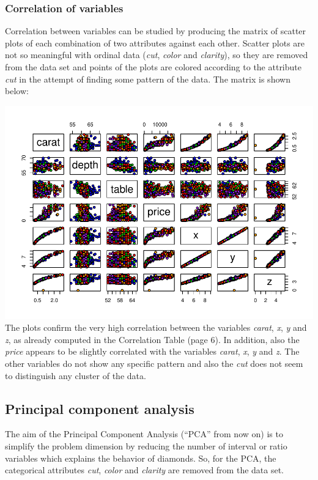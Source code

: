 \documentclass[
]{article}
\begin{document}
\newpage

\subsubsection{Correlation of variables}\label{correlation-of-variables}

Correlation between variables can be studied by producing the matrix of
scatter plots of each combination of two attributes against each other.
Scatter plots are not so meaningful with ordinal data (\emph{cut},
\emph{color} and \emph{clarity}), so they are removed from the data set
and points of the plots are colored according to the attribute
\emph{cut} in the attempt of finding some pattern of the data. The
matrix is shown below:

\includegraphics{Report_files/figure-latex/unnamed-chunk-9-1.pdf} The
plots confirm the very high correlation between the variables
\emph{carat}, \emph{x}, \emph{y} and \emph{z}, as already computed in
the Correlation Table (page 6). In addition, also the \emph{price}
appears to be slightly correlated with the variables \emph{carat},
\emph{x}, \emph{y} and \emph{z}. The other variables do not show any
specific pattern and also the \emph{cut} does not seem to distinguish
any cluster of the data.

\newpage

\subsection{Principal component
analysis}\label{principal-component-analysis}

The aim of the Principal Component Analysis (``PCA'' from now on) is to
simplify the problem dimension by reducing the number of interval or
ratio variables which explains the behavior of diamonds. So, for the
PCA, the categorical attributes \emph{cut}, \emph{color} and
\emph{clarity} are removed from the data set.
\end{document}
